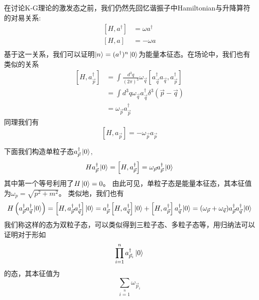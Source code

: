 在讨论K-G理论的激发态之前，我们仍然先回忆谐振子中Hamiltonian与升降算符的对易关系:
\begin{equation}
\begin{aligned}
    \left[H,a^{\dagger}\right]&=\omega a^{\dagger}\\
    \left[H,a\right]&=-\omega a\\
    \end{aligned}
\end{equation}
基于这一关系，我们可以证明$\ket{n}=(a^{\dagger})^{n}\ket{0}$为能量本征态。在场论中，我们也有类似的关系
\begin{equation}
\begin{aligned}
    \left[H,a^{\dagger}_{\vec{p}}\right]&=\int \frac{d^{3}q}{(2\pi)^{3}}\omega_{\vec{q}}\left[a^{\dagger}_{\vec{q}}a_{\vec{q}},a^{\dagger}_{\vec{p}}\right]\\
    &=\int d^{3}q\omega_{\vec{q}}a^{\dagger}_{\vec{q}}\delta^{3}(\vec{p}-\vec{q})\\
        &=\omega_{\vec{p}}a^{\dagger}_{\vec{p}}
    \end{aligned}
\end{equation}
同理我们有
\begin{equation}
    \left[H,a_{\vec{p}}\right]=-\omega_{\vec{p}}a_{\vec{p}}
\end{equation}

下面我们构造单粒子态$a_{\vec{p}}^{\dagger}\ket{0}$,
\begin{equation}
    Ha_{\vec{p}}^{\dagger}\ket{0}=\left[H,a_{\vec{p}}^{\dagger}\right]=\omega_{\vec{p}}a_{\vec{p}}^{\dagger}\ket{0}
\end{equation}
其中第一个等号利用了$H\ket{0}=0$。
由此可见，单粒子态是能量本征态，其本征值为$\omega_{p}=\sqrt{p^{2}+m^{2}}$。
类似地，我们也有
\begin{equation}
    H\left(a_{\vec{p}}^{\dagger}a_{\vec{q}}^{\dagger}\ket{0}\right)=\left[H,a_{\vec{p}}^{\dagger}a_{\vec{q}}^{\dagger}\right]\ket{0}=a_{\vec{p}}^{\dagger}\left[H,a_{\vec{q}}^{\dagger}\right]\ket{0}+\left[H,a_{\vec{p}}^{\dagger}\right]a_{\vec{q}}^{\dagger}\ket{0}=(\omega_{\vec{p}}+\omega_{\vec{q}})a_{\vec{p}}^{\dagger}a_{\vec{q}}^{\dagger}\ket{0}
\end{equation}
我们称这样的态为双粒子态，可以类似得到三粒子态、多粒子态等，用归纳法可以证明对于形如
\begin{equation}
    \prod\limits_{i=1}\limits^{n}a^{\dagger}_{\vec{p}_{i}}\ket{0}
\end{equation}
的态，其本征值为
\begin{equation}
\sum\limits_{i=1}\limits^{n} \omega_{\vec{p}_{i}}
\end{equation}

